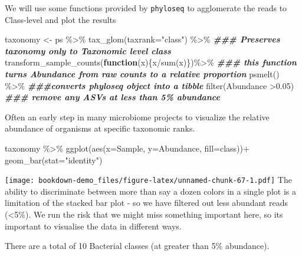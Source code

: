 \documentclass[
]{book}
\newenvironment{Shaded}{\begin{snugshade}}{\end{snugshade}}
\newcommand{\AttributeTok}[1]{\textcolor[rgb]{0.77,0.63,0.00}{#1}}
\newcommand{\ControlFlowTok}[1]{\textcolor[rgb]{0.13,0.29,0.53}{\textbf{#1}}}
\newcommand{\DocumentationTok}[1]{\textcolor[rgb]{0.56,0.35,0.01}{\textbf{\textit{#1}}}}
\newcommand{\FloatTok}[1]{\textcolor[rgb]{0.00,0.00,0.81}{#1}}
\newcommand{\FunctionTok}[1]{\textcolor[rgb]{0.00,0.00,0.00}{#1}}
\newcommand{\NormalTok}[1]{#1}
\newcommand{\OtherTok}[1]{\textcolor[rgb]{0.56,0.35,0.01}{#1}}
\newcommand{\SpecialCharTok}[1]{\textcolor[rgb]{0.00,0.00,0.00}{#1}}
\newcommand{\StringTok}[1]{\textcolor[rgb]{0.31,0.60,0.02}{#1}}
\begin{document}
We will use some functions provided by \texttt{phyloseq} to agglomerate the reads to Class-level and plot the results

\begin{Shaded}
\begin{Highlighting}[]
\NormalTok{taxonomy }\OtherTok{\textless{}{-}}\NormalTok{ ps }\SpecialCharTok{\%\textgreater{}\%} 
  \FunctionTok{tax\_glom}\NormalTok{(}\AttributeTok{taxrank=}\StringTok{"class"}\NormalTok{) }\SpecialCharTok{\%\textgreater{}\%} \DocumentationTok{\#\#\# Preserves taxonomy only to Taxonomic level class}
  \FunctionTok{transform\_sample\_counts}\NormalTok{(}\ControlFlowTok{function}\NormalTok{(x)\{x}\SpecialCharTok{/}\FunctionTok{sum}\NormalTok{(x)\})}\SpecialCharTok{\%\textgreater{}\%} \DocumentationTok{\#\#\# this function turns Abundance from raw counts to a relative proportion}
  \FunctionTok{psmelt}\NormalTok{() }\SpecialCharTok{\%\textgreater{}\%} \DocumentationTok{\#\#\#converts phyloseq object into a tibble }
  \FunctionTok{filter}\NormalTok{(Abundance }\SpecialCharTok{\textgreater{}}\FloatTok{0.05}\NormalTok{) }\DocumentationTok{\#\#\# remove any ASVs at less than 5\% abundance}
\end{Highlighting}
\end{Shaded}

Often an early step in many microbiome projects to visualize the relative abundance of organisms at specific taxonomic ranks.

\begin{Shaded}
\begin{Highlighting}[]
\NormalTok{taxonomy }\SpecialCharTok{\%\textgreater{}\%} 
  \FunctionTok{ggplot}\NormalTok{(}\FunctionTok{aes}\NormalTok{(}\AttributeTok{x=}\NormalTok{Sample, }\AttributeTok{y=}\NormalTok{Abundance, }\AttributeTok{fill=}\NormalTok{class))}\SpecialCharTok{+}
  \FunctionTok{geom\_bar}\NormalTok{(}\AttributeTok{stat=}\StringTok{"identity"}\NormalTok{)}
\end{Highlighting}
\end{Shaded}

\texttt{[image: bookdown-demo\_files/figure-latex/unnamed-chunk-67-1.pdf]}
The ability to discriminate between more than say a dozen colors in a single plot is a limitation of the stacked bar plot - so we have filtered out less abundant reads (\textless5\%). We run the risk that we might miss something important here, so its important to visualise the data in different ways.

There are a total of 10 Bacterial classes (at greater than 5\% abundance).
\end{document}
